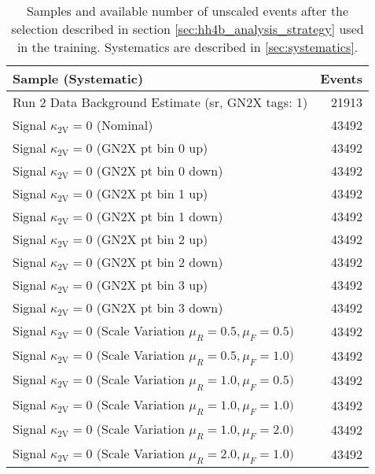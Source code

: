 \begin{table}[]
    \centering
    \caption{Samples and available number of unscaled events after the selection described in section \ref{sec:hh4b_analysis_strategy} used in the training. Systematics are described in \ref{sec:systematics}.}
    \begin{tabular}{lr}
        \hline
        Sample (Systematic)                                                      & Events \\ \hline \hline
        Run 2 Data Background Estimate (\ac{sr}, GN2X tags: 1)                   & 21913  \\ \hline
        Signal $\kappa_\mathrm{2V}=0$ (Nominal)                                  & 43492  \\
        Signal $\kappa_\mathrm{2V}=0$ (GN2X pt bin 0 up)                         & 43492  \\
        Signal $\kappa_\mathrm{2V}=0$ (GN2X pt bin 0 down)                       & 43492  \\
        Signal $\kappa_\mathrm{2V}=0$ (GN2X pt bin 1 up)                         & 43492  \\
        Signal $\kappa_\mathrm{2V}=0$ (GN2X pt bin 1 down)                       & 43492  \\
        Signal $\kappa_\mathrm{2V}=0$ (GN2X pt bin 2 up)                         & 43492  \\
        Signal $\kappa_\mathrm{2V}=0$ (GN2X pt bin 2 down)                       & 43492  \\
        Signal $\kappa_\mathrm{2V}=0$ (GN2X pt bin 3 up)                         & 43492  \\
        Signal $\kappa_\mathrm{2V}=0$ (GN2X pt bin 3 down)                       & 43492  \\
        Signal $\kappa_\mathrm{2V}=0$ (Scale Variation $\mu_R = 0.5, \mu_F=0.5)$ & 43492  \\
        Signal $\kappa_\mathrm{2V}=0$ (Scale Variation $\mu_R = 0.5, \mu_F=1.0)$ & 43492  \\
        Signal $\kappa_\mathrm{2V}=0$ (Scale Variation $\mu_R = 1.0, \mu_F=0.5)$ & 43492  \\
        Signal $\kappa_\mathrm{2V}=0$ (Scale Variation $\mu_R = 1.0, \mu_F=1.0)$ & 43492  \\
        Signal $\kappa_\mathrm{2V}=0$ (Scale Variation $\mu_R = 1.0, \mu_F=2.0)$ & 43492  \\
        Signal $\kappa_\mathrm{2V}=0$ (Scale Variation $\mu_R = 2.0, \mu_F=1.0)$ & 43492  \\

\end{tabular}
\end{table}
